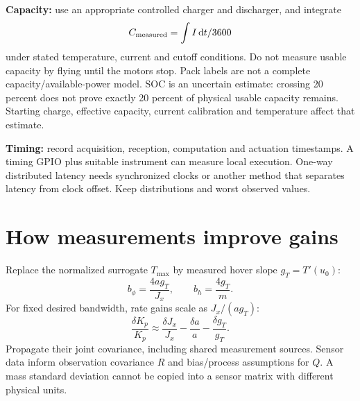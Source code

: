 \textbf{Capacity:} use an appropriate controlled charger and discharger, and integrate
\begin{equation}
C_{\rm measured}=\int I\,\mathrm d t/3600
\end{equation}
under stated temperature, current and cutoff conditions.
Do not measure usable capacity by flying until the motors stop. Pack labels
are not a complete capacity/available-power model.
SOC is an uncertain estimate: crossing 20 percent does not prove exactly 20
percent of physical usable capacity remains. Starting charge, effective capacity,
current calibration and temperature affect that estimate.

\textbf{Timing:} record acquisition, reception, computation and actuation
timestamps. A timing GPIO plus suitable instrument can measure local execution.
One-way distributed latency needs synchronized clocks or another method that
separates latency from clock offset. Keep distributions and worst observed values.

\section{How measurements improve gains}
Replace the normalized surrogate $T_{\max}$ by measured hover slope $g_T=T'(u_0)$:
\begin{equation}
b_\phi=\frac{4ag_T}{J_x},\qquad b_h=\frac{4g_T}{m}.
\end{equation}
For fixed desired bandwidth, rate gains scale as $J_x/(ag_T)$:
\begin{equation}
\frac{\delta K_p}{K_p}\approx
\frac{\delta J_x}{J_x}-\frac{\delta a}{a}-\frac{\delta g_T}{g_T}.
\end{equation}
Propagate their joint covariance, including shared measurement sources.
Sensor data inform observation covariance $R$ and bias/process assumptions for
$Q$. A mass standard deviation cannot be copied into a sensor matrix with
different physical units.
